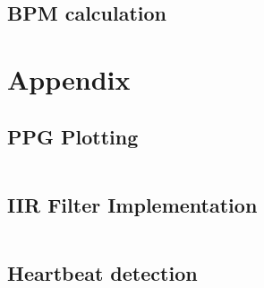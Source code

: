 \documentclass[8pt]{extarticle}
\begin{document}
\subsection{BPM calculation}

\newpage
\onecolumn
\section{Appendix}

\subsection{PPG Plotting}
\begin{verbatim}

\end{verbatim}


\subsection{IIR Filter Implementation}
\begin{verbatim}

\end{verbatim}


\subsection{Heartbeat detection}
\end{document}
